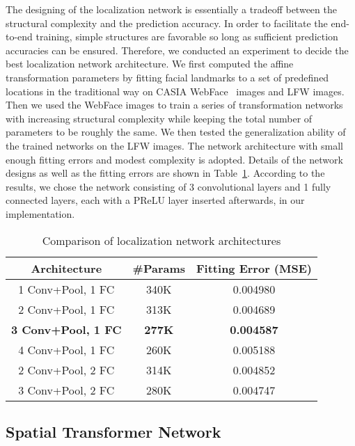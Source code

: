 \documentclass[10pt,twocolumn,letterpaper]{article}
\begin{document}
The designing of the localization network is essentially a tradeoff between the structural complexity and the prediction accuracy. 
In order to facilitate the end-to-end training, simple structures are favorable so long as sufficient prediction accuracies can be ensured.
Therefore, we conducted an experiment to decide the best localization network architecture.
We first computed the affine transformation parameters by fitting facial landmarks to a set of predefined locations in the traditional way on CASIA WebFace~\cite{yi2014learning} images and LFW images.
Then we used the WebFace images to train a series of transformation networks with increasing structural complexity while keeping the total number of parameters to be roughly the same. 
We then tested the generalization ability of the trained networks on the LFW images.
The network architecture with small enough fitting errors and modest complexity is adopted. 
Details of the network designs as well as the fitting errors are shown in Table~\ref{tableLoc}.%
According to the results, we chose the network consisting of 3 convolutional layers and 1 fully connected layers, each with a PReLU layer inserted afterwards, in our implementation.

	\begin{table} %
		\caption{Comparison of localization network architectures}
		\label{tableLoc}
		\centering
		\begin{tabular}{ccc}%
			\hline
			Architecture & \#Params & Fitting Error (MSE)\\
			\hline
			1 Conv+Pool, 1 FC & 340K & 0.004980 \\
			2 Conv+Pool, 1 FC & 313K & 0.004689 \\
			\textbf{3 Conv+Pool, 1 FC} & \textbf{277K} & \textbf{0.004587} \\
			4 Conv+Pool, 1 FC & 260K & 0.005188 \\
			2 Conv+Pool, 2 FC & 314K & 0.004852 \\
			3 Conv+Pool, 2 FC & 280K & 0.004747 \\
			\hline
		\end{tabular}
	\end{table}
	
			
\subsection{Spatial Transformer Network}
\end{document}
